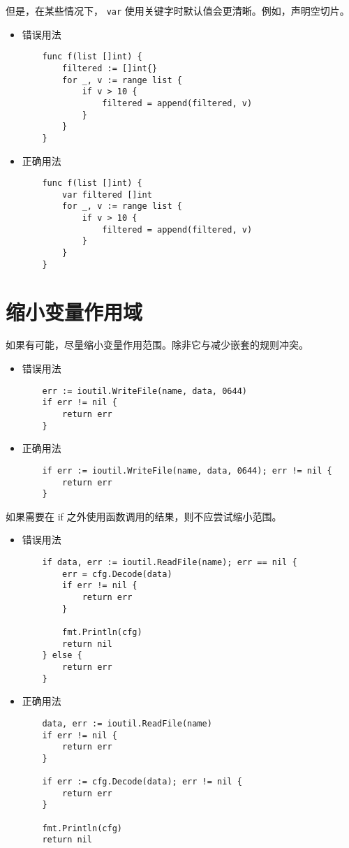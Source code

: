 但是，在某些情况下， \texttt{var} 使用关键字时默认值会更清晰。例如，声明空切片。
\begin{itemize}[leftmargin=4em]
\item 错误用法

  \begin{verbatim}
    func f(list []int) {
    	filtered := []int{}
    	for _, v := range list {
    		if v > 10 {
    			filtered = append(filtered, v)
    		}
    	}
    }
  \end{verbatim}
\item 正确用法

  \begin{verbatim}
    func f(list []int) {
    	var filtered []int
    	for _, v := range list {
    		if v > 10 {
    			filtered = append(filtered, v)
    		}
    	}
    }
  \end{verbatim}
\end{itemize}

\section{缩小变量作用域}
如果有可能，尽量缩小变量作用范围。除非它与减少嵌套的规则冲突。
\begin{itemize}[leftmargin=4em]
\item 错误用法

  \begin{verbatim}
    err := ioutil.WriteFile(name, data, 0644)
    if err != nil {
    	return err
    }
  \end{verbatim}
\item 正确用法

  \begin{verbatim}
    if err := ioutil.WriteFile(name, data, 0644); err != nil {
    	return err
    }
  \end{verbatim}
\end{itemize}

如果需要在 if 之外使用函数调用的结果，则不应尝试缩小范围。
\begin{itemize}[leftmargin=4em]
\item 错误用法

  \begin{verbatim}
    if data, err := ioutil.ReadFile(name); err == nil {
    	err = cfg.Decode(data)
    	if err != nil {
    		return err
    	}

    	fmt.Println(cfg)
    	return nil
    } else {
    	return err
    }
  \end{verbatim}
\item 正确用法

  \begin{verbatim}
    data, err := ioutil.ReadFile(name)
    if err != nil {
    	return err
    }

    if err := cfg.Decode(data); err != nil {
    	return err
    }

    fmt.Println(cfg)
    return nil
  \end{verbatim}
\end{itemize}

